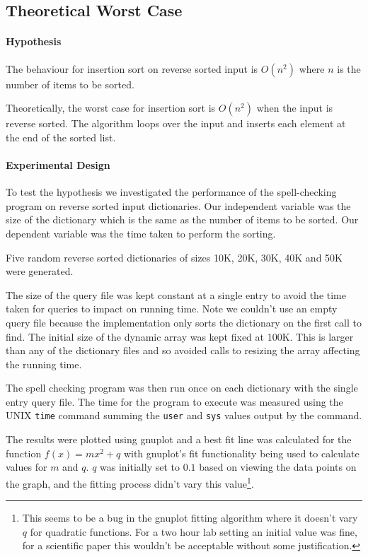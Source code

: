 \documentclass[a4]{article}
\begin{document}
\subsection{Theoretical Worst Case}
\label{sec:worst_case}

\paragraph{Hypothesis} The behaviour for insertion sort on reverse sorted input is $O(n^2)$ where $n$ is the number of items to be sorted.  

Theoretically, the worst case for insertion sort is $O(n^2)$ when the input is reverse sorted.  The algorithm loops over the input and inserts each element at the end of the sorted list.

\paragraph{Experimental Design}
To test the hypothesis we investigated the performance of the spell-checking program on reverse sorted input dictionaries.  Our independent variable was the size of the dictionary which is the same as the number of items to be sorted.  Our dependent variable was the time taken to perform the sorting.

Five random reverse sorted dictionaries of sizes 10K, 20K, 30K, 40K and 50K were generated.

The size of the query file was kept constant at a single entry to avoid the time taken for queries to impact on running time.  Note we couldn't use an empty query file because the implementation only sorts the dictionary on the first call to find.  The initial size of the dynamic array was kept fixed at 100K.  This is larger than any of the dictionary files and so avoided calls to resizing the array affecting the running time.

The spell checking program was then run once on each dictionary with the single entry query file.  The time for the program to execute was measured using the UNIX \texttt{time} command summing the \texttt{user} and \texttt{sys} values output by the command.  

The results were plotted using gnuplot and a best fit line was calculated for the function $f(x) = mx^2 + q$ with gnuplot's fit functionality being used to calculate values for $m$ and $q$.  $q$ was initially set to $0.1$ based on viewing the data points on the graph, and the fitting process didn't vary this value\footnote{This seems to be a bug in the gnuplot fitting algorithm where it doesn't vary $q$ for quadratic functions.  For a two hour lab setting an initial value was fine, for a scientific paper this wouldn't be acceptable without some justification.}.  
\end{document}
